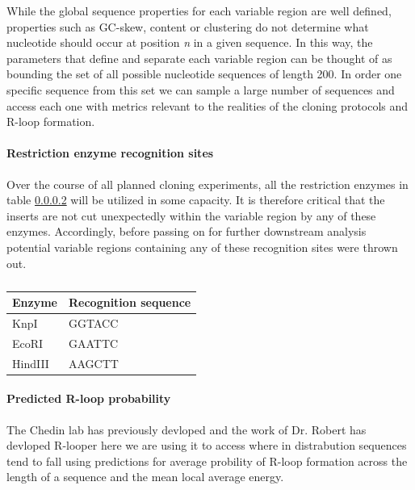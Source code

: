\documentclass[11pt]{article}
\begin{document}


While the global sequence properties for each variable region are well defined, properties such as GC-skew, content or clustering do not determine what nucleotide should occur at position \emph{n} in a given sequence. In this way, the parameters that define and separate each variable region can be thought of as bounding the set of all possible nucleotide sequences of length 200. In order one specific sequence from this set we can sample a large number of sequences and access each one with metrics relevant to the realities of the cloning protocols and R-loop formation. 


\paragraph{Restriction enzyme recognition sites}

Over the course of all planned cloning experiments, all the restriction enzymes in table \ref{} will be utilized in some capacity. It is therefore critical that the inserts are not cut unexpectedly within the variable region by any of these enzymes. Accordingly, before passing on for further downstream analysis potential variable regions containing any of these recognition sites were thrown out. 

\begin{table}[H]
	\caption{}
	\label{tab:enzymes}
	\centering
	\begin{tabular}{@{}ll@{}}
		\toprule
		Enzyme  & Recognition sequence \\ \midrule
		KnpI    & GGTACC               \\
		EcoRI   & GAATTC               \\
		HindIII & AAGCTT               \\ \bottomrule
	\end{tabular}
\end{table}


\paragraph{Predicted R-loop probability}

The Chedin lab has previously devloped and the work of Dr. Robert has devloped R-looper here we are using it to access where in distrabution sequences tend to fall using predictions for average probility of R-loop formation across the length of a sequence and the mean local average energy. 
\end{document}

